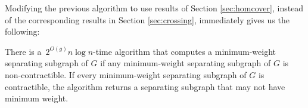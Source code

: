 \documentclass[letterpaper,review]{siamart190516}
\begin{document}
{Modifying the previous algorithm to use results of Section \ref{sec:homcover}, instead of the corresponding results in Section \ref{sec:crossing}, immediately gives us the following:

\begin{lemma}
\label{lem:global_split-alg2}
There is a~$2^{O(g)} n \log n$-time algorithm that computes a minimum-weight separating subgraph of $G$ if any minimum-weight separating subgraph of $G$ is non-contractible.  If every minimum-weight separating subgraph of $G$ is contractible, the algorithm returns a separating subgraph that may not have minimum weight.
\end{lemma}

%
%
%
%
%
}
\end{document}
